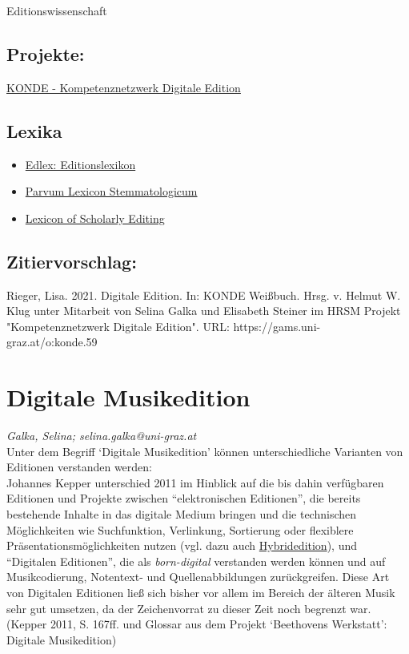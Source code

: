 \documentclass{article}
\begin{document}
Editionswissenschaft\subsection*{Projekte:}\href{http://www.digitale-edition.at}{KONDE - Kompetenznetzwerk Digitale Edition}\subsection*{Lexika}\begin{itemize}\item \href{https://edlex.de/index.php?title=Digitale_Edition}{Edlex: Editionslexikon}\item \href{https://wiki.helsinki.fi/display/stemmatology/Edition%2C+digital}{Parvum Lexicon Stemmatologicum}\item \href{https://lexiconse.uantwerpen.be/index.php/lexicon/edition-digital/}{Lexicon of Scholarly Editing}\end{itemize}\subsection*{Zitiervorschlag:}Rieger, Lisa. 2021. Digitale Edition. In: KONDE Weißbuch. Hrsg. v. Helmut W. Klug unter Mitarbeit von Selina Galka und Elisabeth Steiner im HRSM Projekt "Kompetenznetzwerk Digitale Edition". URL: https://gams.uni-graz.at/o:konde.59\newpage\section*{Digitale Musikedition} \emph{Galka, Selina; selina.galka@uni-graz.at}\\
        
    Unter dem Begriff ‘Digitale Musikedition’ können unterschiedliche Varianten von Editionen verstanden werden:\\
            
        Johannes Kepper unterschied 2011 im Hinblick auf die bis dahin verfügbaren Editionen und Projekte zwischen “elektronischen Editionen”, die bereits bestehende Inhalte in das digitale Medium bringen und die technischen Möglichkeiten wie Suchfunktion, Verlinkung, Sortierung oder flexiblere Präsentationsmöglichkeiten nutzen (vgl. dazu auch \href{http://gams.uni-graz.at/o:konde.96}{Hybridedition}), und “Digitalen Editionen”, die als \emph{born-digital} verstanden werden können und auf Musikcodierung, Notentext- und Quellenabbildungen zurückgreifen. Diese Art von Digitalen Editionen ließ sich bisher vor allem im Bereich der älteren Musik sehr gut umsetzen, da der Zeichenvorrat zu dieser Zeit noch begrenzt war. (Kepper 2011, S. 167ff. und Glossar aus dem Projekt ‘Beethovens Werkstatt’: Digitale Musikedition)\\
            
\end{document}
